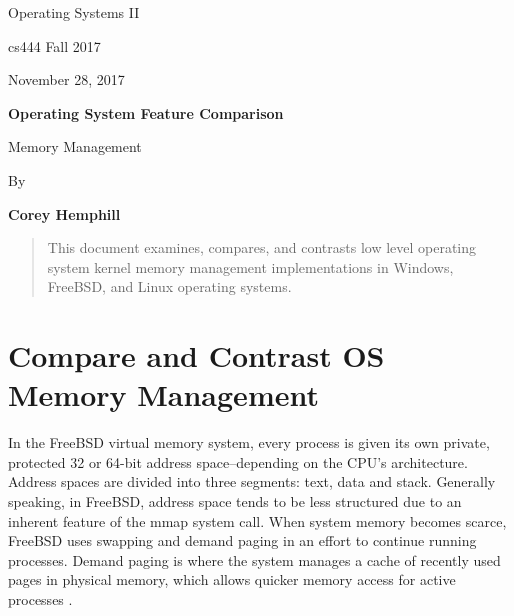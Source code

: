 \documentclass[letterpaper,10pt,draftclsnofoot,onecolumn]{IEEEtran}
\def \Author{Corey Hemphill}
\def \Title{Operating System Feature Comparison}
\def \Subtitle{Memory Management}
\def \Term{cs444 Fall 2017}
\def \DueDate{November 28, 2017}
\def \DocType{
	Operating Systems II
}
\begin{document}
\begin{titlepage}
    \begin{singlespace}
        \hfill  
        \par\vspace{.2in}
        \centering
        \scshape{
            \huge  \DocType \par
           	\huge \Term \par
            {\large \DueDate}\par
            \vspace{.5in}
            \textbf{\Huge \Title}\par
            {\large \Subtitle}\par
            \vspace{.5in}
           
            {\large By }\par
           	\textbf{\Author}\par
   
            \vspace{5pt}
            }
            \vspace{120pt}
        
        \begin{abstract}
        This document examines, compares, and contrasts low level operating system kernel memory management implementations in Windows, FreeBSD, and Linux operating systems.
        \end{abstract} 
        
    \end{singlespace}
\end{titlepage}
\newpage

\section{Compare and Contrast OS Memory Management}
\noindent In the FreeBSD virtual memory system, every process is given its own private, protected 32 or 64-bit address space–depending on the CPU’s architecture. Address spaces are divided into three segments: text, data and stack. Generally speaking, in FreeBSD, address space tends to be less structured due to an inherent feature of the mmap system call. When system memory becomes scarce, FreeBSD uses swapping and demand paging in an effort to continue running processes. Demand paging is where the system manages a cache of recently used pages in physical memory, which allows quicker memory access for active processes \cite{FreeBSD1}\cite{FreeBSD2}.\\

\noindent \cite{MSWindows1}\\
\cite{MSWindows2}\\
\cite{MSWindows3}\\
\cite{Linux1}\\
\cite{Linux2}\\


%

\newpage


\end{document}
